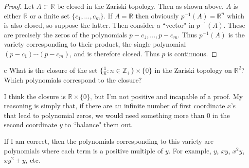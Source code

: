 \documentclass[11pt]{article}
\begin{document}
\begin{proof}
  Let $A \subset \mathbb{R}$ be closed in the Zariski topology. Then as shown
  above, $A$ is either $\mathbb{R}$ or a finite set $\{c_1, \ldots, c_m\}$. If
  $A = \mathbb{R}$ then obviously $p^{-1}(A) = \mathbb{R}^n$ which is also
  closed, so suppose the latter. Then consider a ``vector" in $p^{-1}(A)$. These
  are precisely the zeros of the polynomials $p - c_1, \ldots, p - c_m$. Thus
  $p^{-1}(A)$ is the variety corresponding to their product, the
  single polynomial $(p - c_1) \cdots (p - c_m)$, and is therefore closed. Thus
  $p$ is continuous.
\end{proof}

\begin{p}{c}
  What is the closure of the set $\{\frac{1}{n} : n \in \mathbb{Z}_+\} \times
  \{0\}$ in the Zariski topology on $\mathbb{R}^2$? Which polynomials correspond
  to the closure?
\end{p}

\begin{solution}
  I think the closure is $\mathbb{R} \times \{0\}$, but I'm not positive and
  incapable of a proof. My reasoning is simply that, if there are an infinite
  number of first coordinate $x$'s that lead to polynomial zeros, we would need
  something more than $0$ in the second coordinate $y$ to ``balance" them out.

  If I am correct, then the polynomials corresponding to this variety are
  polynomials where each term is a positive multiple of $y$. For example, $y$,
  $xy$, $x^2y$, $xy^2 + y$, etc.
\end{solution}
\end{document}
